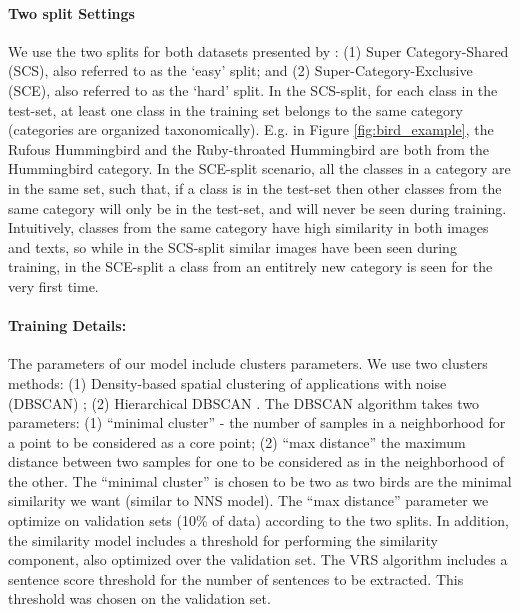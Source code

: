 \documentclass[11pt,a4paper]{article}
\begin{document}
\paragraph{Two split Settings} We use the two splits for both datasets presented by \citet{elhoseiny2017link}: (1) Super Category-Shared (SCS), also referred to as the \enquote*{easy} split; and (2) Super-Category-Exclusive (SCE), also referred to as the \enquote*{hard} split. In the SCS-split, for each class in the test-set, at least one class in the training set belongs to the same category (categories are organized taxonomically). E.g. in Figure \ref{fig:bird_example}, the Rufous Hummingbird and the Ruby-throated Hummingbird are both from the Hummingbird category. In the SCE-split scenario, all the classes in a category are in the same set, such that, if a class is in the test-set then other classes from the same category will only be in the test-set, and will never be seen during training. Intuitively, classes from the same category have high similarity in both images and texts, so while in the SCS-split similar images have been seen during training, in the SCE-split a class from an entitrely new category is seen for the very first time. %

\paragraph{Training Details:}
The parameters of our model include clusters parameters. We use two clusters methods: (1) Density-based spatial clustering of applications with noise (DBSCAN) \citep{ester1996density}; (2) Hierarchical DBSCAN \citep{mcinnes2017hdbscan}. The DBSCAN algorithm takes two parameters: (1) \enquote{minimal cluster} - the number of samples in a neighborhood for a point to be considered as a core point; (2) \enquote{max distance} the maximum distance between two samples for one to be considered as in the neighborhood of the other. 
The \enquote{minimal cluster} is chosen to be two as two birds are the minimal similarity we want (similar to NNS model).
The  \enquote{max distance} parameter we optimize on validation sets (10\% of data) according to the two splits. In addition, the similarity model includes a threshold for performing the similarity component, also optimized over the validation set. 
The VRS algorithm includes a sentence score threshold for the number of sentences to be extracted. This threshold was chosen on the validation set.
\end{document}
